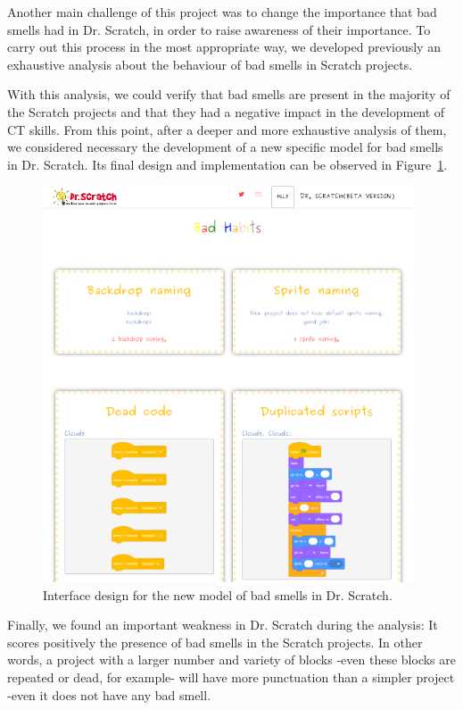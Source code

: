 Another main challenge of this project was to change the importance that bad smells had in Dr. Scratch, in order to raise awareness of their importance. To carry out this process in the most appropriate way, we developed previously an exhaustive analysis about the behaviour of bad smells in Scratch projects.

With this analysis, we could verify that bad smells are present in the majority of the Scratch projects and that they had a negative impact in the development of CT skills. From this point, after a deeper and more exhaustive analysis of them, we considered necessary the development of a new specific model for bad smells in Dr. Scratch. Its final design and implementation can be observed in Figure~\ref{fig:bad_smells_model}.

\begin{figure}
  \centering
  \includegraphics[width=11cm, keepaspectratio]{img/new_model.png}
  \caption{Interface design for the new model of bad smells in Dr. Scratch.}
  \label{fig:bad_smells_model}
\end{figure}

Finally, we found an important weakness in Dr. Scratch during the analysis: It scores positively the presence of bad smells in the Scratch projects. In other words, a project with a larger number and variety of blocks -even these blocks are repeated or dead, for example- will have more punctuation than a simpler project -even it does not have any bad smell. 

